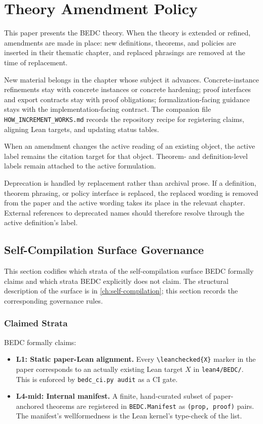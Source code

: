 \chapter{Theory Amendment Policy}
\label{ch:theory-amendment-policy}

This paper presents the BEDC theory. When the theory is extended or refined, amendments are made in place: new definitions, theorems, and policies are inserted in their thematic chapter, and replaced phrasings are removed at the time of replacement.

New material belongs in the chapter whose subject it advances. Concrete-instance refinements stay with concrete instances or concrete hardening; proof interfaces and export contracts stay with proof obligations; formalization-facing guidance stays with the implementation-facing contract. The companion file \texttt{HOW\_INCREMENT\_WORKS.md} records the repository recipe for registering claims, aligning Lean targets, and updating status tables.

When an amendment changes the active reading of an existing object, the active label remains the citation target for that object. Theorem- and definition-level labels remain attached to the active formulation.

Deprecation is handled by replacement rather than archival prose. If a definition, theorem phrasing, or policy interface is replaced, the replaced wording is removed from the paper and the active wording takes its place in the relevant chapter. External references to deprecated names should therefore resolve through the active definition's label.

\section{Self-Compilation Surface Governance}\label{sec:self-compilation-governance}

This section codifies which strata of the self-compilation surface BEDC formally claims and which strata BEDC explicitly does not claim. The structural description of the surface is in \autoref{ch:self-compilation}; this section records the corresponding governance rules.

\subsection{Claimed Strata}\label{subsec:self-comp-claimed}

BEDC formally claims:
\begin{itemize}
  \item \textbf{L1: Static paper-Lean alignment.} Every \texttt{\textbackslash leanchecked\{X\}} marker in the paper corresponds to an actually existing Lean target $X$ in \texttt{lean4/BEDC/}. This is enforced by \texttt{bedc\_ci.py audit} as a CI gate.
  \item \textbf{L4-mid: Internal manifest.} A finite, hand-curated subset of paper-anchored theorems are registered in \texttt{BEDC.Manifest} as \texttt{(prop, proof)} pairs. The manifest's wellformedness is the Lean kernel's type-check of the list.
\end{itemize}

